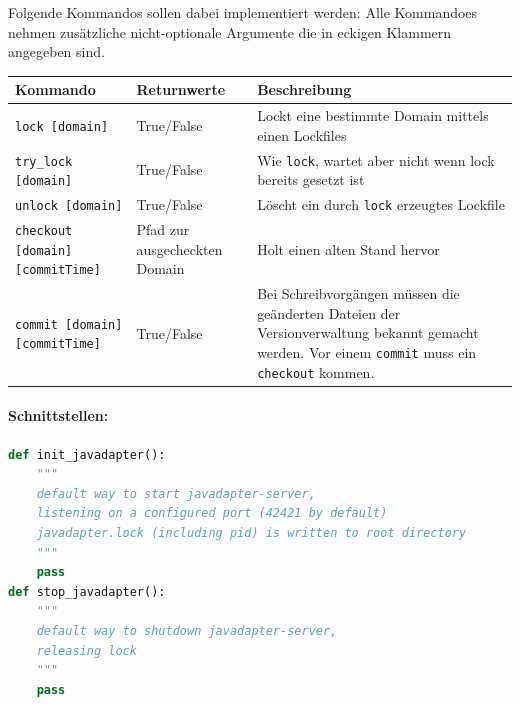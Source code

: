 Folgende Kommandos sollen dabei implementiert werden:
Alle Kommandoes nehmen zusätzliche nicht-optionale Argumente die in
eckigen Klammern angegeben sind.
\begin{table}[h]
  \begin{tabular}{|p{4cm}|p{5cm}|p{7cm}|}
    \hline
    \textbf{Kommando} & \textbf{Returnwerte} & \textbf{Beschreibung} \\
    \hline
    \texttt{lock [domain]} 
    & True/False 
    & Lockt eine bestimmte Domain mittels einen Lockfiles 
    \\
    \hline
    \texttt{try\_lock [domain]} 
    & True/False 
    & Wie \texttt{lock}, wartet aber nicht wenn lock bereits gesetzt ist 
    \\
    \hline
    \texttt{unlock [domain]} 
    & True/False 
    & Löscht ein durch \texttt{lock} erzeugtes Lockfile 
    \\
    \hline
    \texttt{checkout [domain] [commitTime]} 
    & Pfad zur ausgecheckten Domain
    & Holt einen alten Stand hervor
    \\
    \hline
    \texttt{commit [domain] [commitTime]} 
    & True/False 
    & Bei Schreibvorgängen müssen die geänderten Dateien
      der Versionverwaltung bekannt gemacht werden.
      Vor einem \texttt{commit} muss ein \texttt{checkout} kommen.
    \\
    \hline
  \end{tabular}
\end{table}

\paragraph{Schnittstellen:}
\label{par:schnittstellen_}

\begin{lstlisting}[language=python]
def init_javadapter():
    """
    default way to start javadapter-server,
    listening on a configured port (42421 by default)
    javadapter.lock (including pid) is written to root directory
    """
    pass
def stop_javadapter():
    """
    default way to shutdown javadapter-server,
    releasing lock
    """
    pass
\end{lstlisting}
